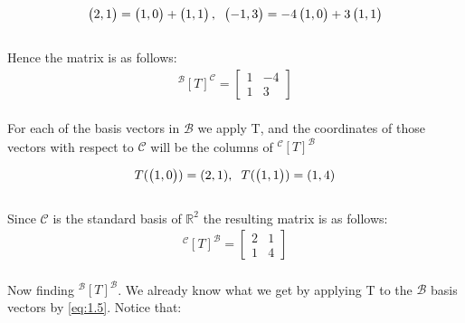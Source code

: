 \documentclass[reqno,a4paper,12pt]{amsart}
\newcommand{\R}{\mathbb{R}}
\newcommand{\C}{\mathscr{C}}
\newcommand{\B}{\mathscr{B}}
\numberwithin{equation}{section}
\begin{document}
  \begin{align}
    \begin{pmatrix}
      2 , 1 \\
    \end{pmatrix}
    =
    \begin{pmatrix}
    1,0
    \end{pmatrix}
    +
    \begin{pmatrix}
    1,1
    \end{pmatrix},\hspace{0.2cm}
    \begin{pmatrix}
      -1 , 3 \\
    \end{pmatrix}
    = 
    -4
    \begin{pmatrix}
     1,0
    \end{pmatrix}
    +
    3
    \begin{pmatrix}
    1,1
    \end{pmatrix} \label{eq:1.3}
  \end{align}\\
Hence the matrix is as follows:
  \begin{align}
     ^\B[T]^\C 
     =
     \begin{bmatrix}
       1 & -4 \\
       1 & 3
     \end{bmatrix} \label{eq:1.4}
   \end{align}\\
For each of the basis vectors in $\B$ we apply T, and the coordinates of those vectors with respect to $\C$ will be the columns of $^\C[T]^\B$

  \begin{align}
  T(
    \begin{pmatrix}
      1 , 0 \\
    \end{pmatrix}
    )
    =
    (2,1),\hspace{0.2cm}
    T(
    \begin{pmatrix}
    1 , 1 \\
    \end{pmatrix}
    )
    =
    (1,4) \label{eq:1.5}
  \end{align}\\
Since $\C$ is the standard basis of $\R^2$ the resulting matrix is as follows:
  \begin{align}
     ^\C[T]^\B 
     =
     \begin{bmatrix}
       2 & 1 \\
       1  & 4
     \end{bmatrix} \label{eq:1.6}
   \end{align}\\
Now finding $^\B[T]^\B$. We already know what we get by applying T to the $\B$ basis vectors by \eqref{eq:1.5}. Notice that:
\end{document}
